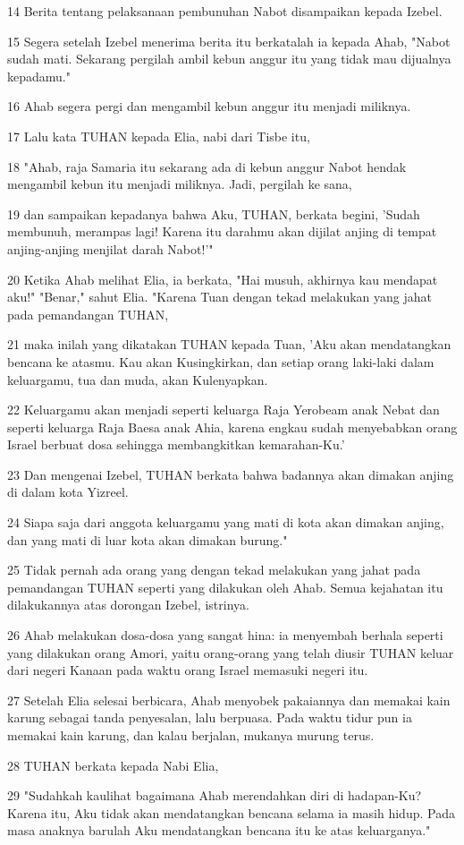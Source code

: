 \par 14 Berita tentang pelaksanaan pembunuhan Nabot disampaikan kepada Izebel.
\par 15 Segera setelah Izebel menerima berita itu berkatalah ia kepada Ahab, "Nabot sudah mati. Sekarang pergilah ambil kebun anggur itu yang tidak mau dijualnya kepadamu."
\par 16 Ahab segera pergi dan mengambil kebun anggur itu menjadi miliknya.
\par 17 Lalu kata TUHAN kepada Elia, nabi dari Tisbe itu,
\par 18 "Ahab, raja Samaria itu sekarang ada di kebun anggur Nabot hendak mengambil kebun itu menjadi miliknya. Jadi, pergilah ke sana,
\par 19 dan sampaikan kepadanya bahwa Aku, TUHAN, berkata begini, 'Sudah membunuh, merampas lagi! Karena itu darahmu akan dijilat anjing di tempat anjing-anjing menjilat darah Nabot!'"
\par 20 Ketika Ahab melihat Elia, ia berkata, "Hai musuh, akhirnya kau mendapat aku!" "Benar," sahut Elia. "Karena Tuan dengan tekad melakukan yang jahat pada pemandangan TUHAN,
\par 21 maka inilah yang dikatakan TUHAN kepada Tuan, 'Aku akan mendatangkan bencana ke atasmu. Kau akan Kusingkirkan, dan setiap orang laki-laki dalam keluargamu, tua dan muda, akan Kulenyapkan.
\par 22 Keluargamu akan menjadi seperti keluarga Raja Yerobeam anak Nebat dan seperti keluarga Raja Baesa anak Ahia, karena engkau sudah menyebabkan orang Israel berbuat dosa sehingga membangkitkan kemarahan-Ku.'
\par 23 Dan mengenai Izebel, TUHAN berkata bahwa badannya akan dimakan anjing di dalam kota Yizreel.
\par 24 Siapa saja dari anggota keluargamu yang mati di kota akan dimakan anjing, dan yang mati di luar kota akan dimakan burung."
\par 25 Tidak pernah ada orang yang dengan tekad melakukan yang jahat pada pemandangan TUHAN seperti yang dilakukan oleh Ahab. Semua kejahatan itu dilakukannya atas dorongan Izebel, istrinya.
\par 26 Ahab melakukan dosa-dosa yang sangat hina: ia menyembah berhala seperti yang dilakukan orang Amori, yaitu orang-orang yang telah diusir TUHAN keluar dari negeri Kanaan pada waktu orang Israel memasuki negeri itu.
\par 27 Setelah Elia selesai berbicara, Ahab menyobek pakaiannya dan memakai kain karung sebagai tanda penyesalan, lalu berpuasa. Pada waktu tidur pun ia memakai kain karung, dan kalau berjalan, mukanya murung terus.
\par 28 TUHAN berkata kepada Nabi Elia,
\par 29 "Sudahkah kaulihat bagaimana Ahab merendahkan diri di hadapan-Ku? Karena itu, Aku tidak akan mendatangkan bencana selama ia masih hidup. Pada masa anaknya barulah Aku mendatangkan bencana itu ke atas keluarganya."

